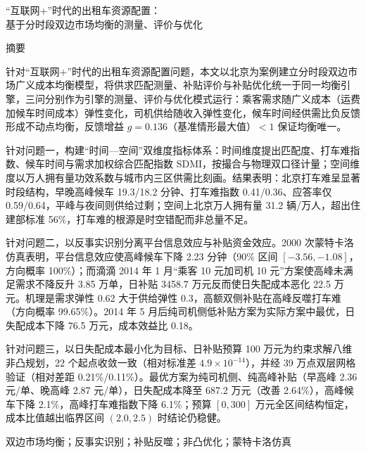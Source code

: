 \documentclass[12pt,a4paper]{ctexart}
\begin{document}
\begin{titlepage}
\centering
{\heiti “互联网+”时代的出租车资源配置：\\[0.3em]基于分时段双边市场均衡的测量、评价与优化\par}
\vspace{0.5cm}
{\heiti 摘\hspace{2em}要\par}
\vspace{0.2cm}

\begin{minipage}{0.95\textwidth}
\setlength{\parindent}{2em}
针对“互联网+”时代的出租车资源配置问题，本文以北京为案例建立分时段双边市场广义成本均衡模型，将供求匹配测量、补贴评价与补贴优化统一于同一均衡引擎，三问分别作为引擎的测量、评价与优化模式运行：乘客需求随广义成本（运费加候车时间成本）弹性变化，司机供给随收入弹性变化，候车时间经供需比负反馈形成不动点均衡，反馈增益 $g=0.136$（基准情形最大值）$<1$ 保证均衡唯一。

针对问题一，构建“时间—空间”双维度指标体系：时间维度提出匹配度、打车难指数、候车时间与需求加权综合匹配指数 SDMI，按撮合与物理双口径计量；空间维度以万人拥有量功效系数与城市内三区供需比刻画。结果表明：北京打车难呈显著时段结构，早晚高峰候车 19.3/18.2 分钟、打车难指数 0.41/0.36、应答率仅 0.59/0.64，平峰与夜间则供给过剩；空间上北京万人拥有量 31.2 辆/万人，超出住建部标准 56\%，打车难的根源是时空错配而非总量不足。

针对问题二，以反事实识别分离平台信息效应与补贴资金效应。2000 次蒙特卡洛仿真表明，平台信息效应使高峰候车下降 2.23 分钟（90\% 区间 $[-3.56,-1.08]$，方向概率 100\%）；而滴滴 2014 年 1 月“乘客 10 元加司机 10 元”方案使高峰未满足需求不降反升 3.85 万单，日补贴 3458.7 万元反而使日失配成本恶化 22.5 万元。机理是需求弹性 0.62 大于供给弹性 0.3，高额双侧补贴在高峰反噬打车难（方向概率 99.65\%）。2014 年 5 月后纯司机侧低补贴方案为实际方案中最优，日失配成本下降 76.5 万元，成本效益比 0.18。

针对问题三，以日失配成本最小化为目标、日补贴预算 100 万元为约束求解八维非凸规划，22 个起点收敛一致（相对标准差 $4.9\times10^{-14}$），并经 39 万点双层网格验证（相对差距 0.21\%/0.11\%）。最优方案为纯司机侧、纯高峰补贴（早高峰 2.36 元/单、晚高峰 2.87 元/单），日失配成本降至 687.2 万元（改善 2.64\%），高峰候车下降 2.1\%，高峰打车难指数下降 6.1\%；预算 $[0,300]$ 万元全区间结构恒定，成本比值越出临界区间 $(2.0,2.5)$ 时结论仍稳健。

\vspace{0.3cm}
双边市场均衡；反事实识别；补贴反噬；非凸优化；蒙特卡洛仿真
\end{minipage}
\end{titlepage}
\end{document}
